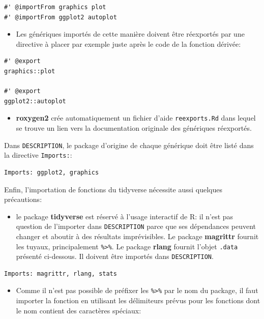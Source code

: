 \documentclass[
  12pt,
  french,
  a4paper,
  extrafontsizes,onecolumn,openright
  ]{memoir}
\providecommand{\tightlist}{%
  \setlength{\itemsep}{0pt}\setlength{\parskip}{0pt}}
\begin{document}
\begin{verbatim}
#' @importFrom graphics plot
#' @importFrom ggplot2 autoplot
\end{verbatim}

\begin{itemize}
\tightlist
\item
  Les génériques importés de cette manière doivent être réexportés par une directive à placer par exemple juste après le code de la fonction dérivée:
\end{itemize}

\begin{verbatim}
#' @export
graphics::plot

#' @export
ggplot2::autoplot
\end{verbatim}

\begin{itemize}
\tightlist
\item
  \textbf{roxygen2} crée automatiquement un fichier d'aide \texttt{reexports.Rd} dans lequel se trouve un lien vers la documentation originale des génériques réexportés.
\end{itemize}

Dans \texttt{DESCRIPTION}, le package d'origine de chaque générique doit être listé dans la directive \texttt{Imports:}:

\begin{verbatim}
Imports: ggplot2, graphics
\end{verbatim}

Enfin, l'importation de fonctions du tidyverse nécessite aussi quelques précautions:

\begin{itemize}
\tightlist
\item
  le package \textbf{tidyverse} est réservé à l'usage interactif de R: il n'est pas question de l'importer dans \texttt{DESCRIPTION} parce que ses dépendances peuvent changer et aboutir à des résultats imprévisibles.
  Le package \textbf{magrittr} fournit les tuyaux, principalement \texttt{\%\textgreater{}\%}.
  Le package \textbf{rlang} fournit l'objet \texttt{.data} présenté ci-dessous.
  Il doivent être importés dans \texttt{DESCRIPTION}.
\end{itemize}

\begin{verbatim}
Imports: magrittr, rlang, stats
\end{verbatim}

\begin{itemize}
\tightlist
\item
  Comme il n'est pas possible de préfixer les \texttt{\%\textgreater{}\%} par le nom du package, il faut importer la fonction en utilisant les délimiteurs prévus pour les fonctions dont le nom contient des caractères spéciaux:
\end{itemize}
\end{document}
